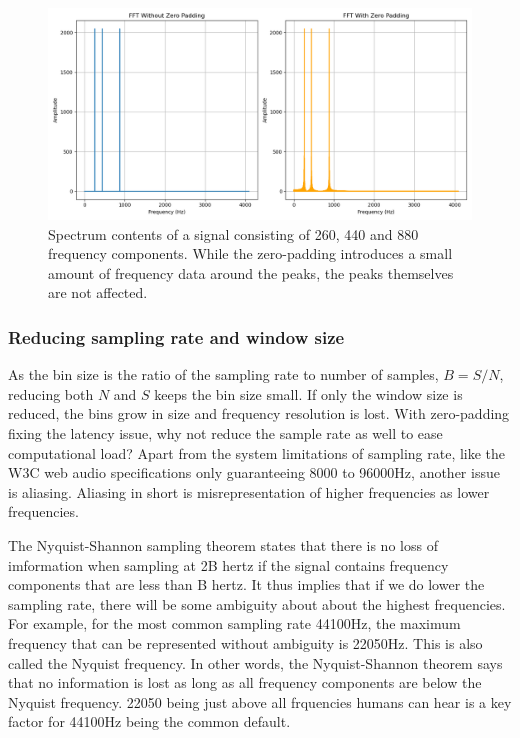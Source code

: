 \begin{figure}[ht]
    \centering
    \includegraphics[width=\textwidth]{./images/zero_pad_spectrum.png}
    \caption{Spectrum contents of a signal consisting of 260, 440 and 880 frequency components. While the zero-padding introduces a small amount of frequency data around the peaks, the peaks themselves are not affected. \label{fig:zeropadSpectrum}}
\end{figure}

\subsubsection{Reducing sampling rate and window size}
As the bin size is the ratio of the sampling rate to number of samples, $B = S/N$, reducing both $N$ and $S$ keeps the bin size small. If only the window size is reduced, the bins grow in size and frequency resolution is lost. With zero-padding fixing the latency issue, why not reduce the sample rate as well to ease computational load? Apart from the system limitations of sampling rate, like the W3C web audio specifications only guaranteeing 8000 to 96000Hz, another issue is aliasing. Aliasing in short is misrepresentation of higher frequencies as lower frequencies. 

The Nyquist-Shannon sampling theorem states that there is no loss of imformation when sampling at 2B hertz if the signal contains frequency components that are less than B hertz. It thus implies that if we do lower the sampling rate, there will be some ambiguity about about the highest frequencies. For example, for the most common sampling rate 44100Hz, the maximum frequency that can be represented without ambiguity is 22050Hz. This is also called the Nyquist frequency. In other words, the Nyquist-Shannon theorem says that no information is lost as long as all frequency components are below the Nyquist frequency. 22050 being just above all frquencies humans can hear is a key factor for 44100Hz being the common default. 

